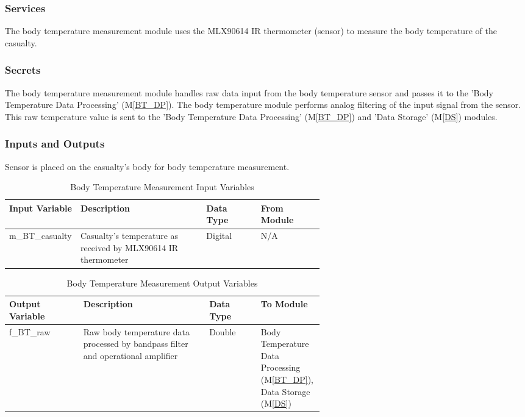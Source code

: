 \documentclass{article}
\begin{document}
\begin{description}
        \subsubsection{Services}
        The body temperature measurement module uses the MLX90614 IR thermometer (sensor) to measure the body temperature of the casualty.
        \subsubsection{Secrets}
        The body temperature measurement module handles raw data input from the body temperature sensor and passes it to the 'Body Temperature Data Processing' (M\ref{BT_DP}). The body temperature module performs analog filtering of the input signal from the sensor. This raw temperature value is sent to the 'Body Temperature Data Processing' (M\ref{BT_DP}) and 'Data Storage' (M\ref{DS}) modules.
        
        \subsubsection{Inputs and Outputs}
        Sensor is placed on the casualty's body for body temperature measurement.
            \begin{longtable}{|l|p{0.4\linewidth}|l|p{0.2\linewidth}|}
            \caption{Body Temperature Measurement Input Variables}
            \hline
            \textbf{Input Variable} & \textbf{Description} & \textbf {Data Type} & \textbf{From Module} \\
            \endhead
            \hline
            m\_BT\_casualty & Casualty's temperature as received by MLX90614 IR thermometer & Digital & N/A \\
            
            \hline
            \end{longtable}
            \begin{longtable}{|l|p{0.4\linewidth}|l|p{0.2\linewidth}|}
            \caption{Body Temperature Measurement Output Variables}
            \hline
            \textbf{Output Variable} & \textbf{Description} & \textbf {Data Type} & \textbf{To Module} \\
            \endhead
            \hline
            f\_BT\_raw & Raw body temperature data processed by bandpass filter and operational amplifier & Double & Body Temperature Data Processing (M\ref{BT_DP}), Data Storage (M\ref{DS}) \\
            \hline
            \end{longtable}

\end{description}
\end{document}
